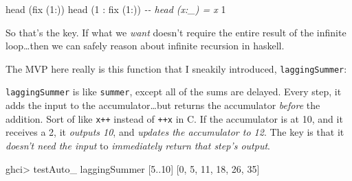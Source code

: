 \documentclass[]{article}
\newenvironment{Shaded}{}{}
\newcommand{\CommentTok}[1]{\textcolor[rgb]{0.38,0.63,0.69}{\textit{#1}}}
\newcommand{\DataTypeTok}[1]{\textcolor[rgb]{0.56,0.13,0.00}{#1}}
\newcommand{\DecValTok}[1]{\textcolor[rgb]{0.25,0.63,0.44}{#1}}
\newcommand{\FunctionTok}[1]{\textcolor[rgb]{0.02,0.16,0.49}{#1}}
\newcommand{\KeywordTok}[1]{\textcolor[rgb]{0.00,0.44,0.13}{\textbf{#1}}}
\newcommand{\NormalTok}[1]{#1}
\newcommand{\OperatorTok}[1]{\textcolor[rgb]{0.40,0.40,0.40}{#1}}
\newcommand{\OtherTok}[1]{\textcolor[rgb]{0.00,0.44,0.13}{#1}}
\begin{document}
\begin{Shaded}
\begin{Highlighting}[]
\FunctionTok{head}\NormalTok{ (fix (}\DecValTok{1}\OperatorTok{:}\NormalTok{))}
\FunctionTok{head}\NormalTok{ (}\DecValTok{1} \OperatorTok{:}\NormalTok{ fix (}\DecValTok{1}\OperatorTok{:}\NormalTok{))     }\CommentTok{{-}{-} head (x:\_) = x}
\DecValTok{1}
\end{Highlighting}
\end{Shaded}

So that's the key. If what we \emph{want} doesn't require the entire result of
the infinite loop\ldots then we can safely reason about infinite recursion in
haskell.

The MVP here really is this function that I sneakily introduced,
\texttt{laggingSummer}:

\begin{Shaded}
\end{Shaded}

\texttt{laggingSummer} is like \texttt{summer}, except all of the sums are
delayed. Every step, it adds the input to the accumulator\ldots but returns the
accumulator \emph{before} the addition. Sort of like \texttt{x++} instead of
\texttt{++x} in C. If the accumulator is at 10, and it receives a 2, it
\emph{outputs 10}, and \emph{updates the accumulator to 12}. The key is that it
\emph{doesn't need the input} to \emph{immediately return that step's output}.

\begin{Shaded}
\begin{Highlighting}[]
\NormalTok{ghci}\OperatorTok{\textgreater{}}\NormalTok{ testAuto\_ laggingSummer [}\DecValTok{5}\OperatorTok{..}\DecValTok{10}\NormalTok{]}
\NormalTok{[}\DecValTok{0}\NormalTok{, }\DecValTok{5}\NormalTok{, }\DecValTok{11}\NormalTok{, }\DecValTok{18}\NormalTok{, }\DecValTok{26}\NormalTok{, }\DecValTok{35}\NormalTok{]}
\end{Highlighting}
\end{Shaded}
\end{document}
